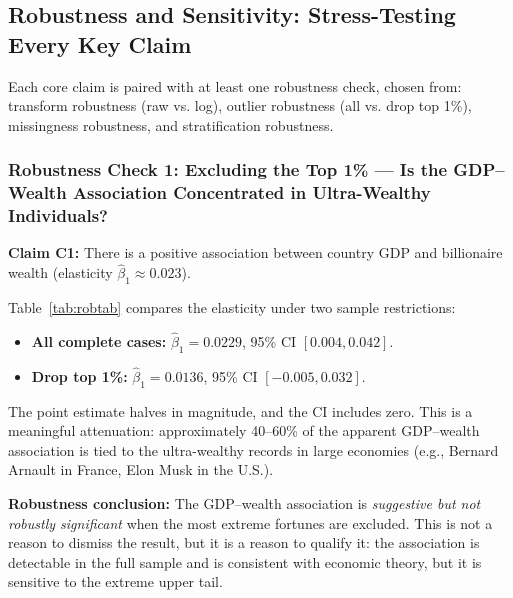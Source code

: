 \documentclass[a4paper,10pt]{article}
\begin{document}
\bigskip

\subsection{Robustness and Sensitivity: Stress-Testing Every Key Claim}\label{sec:robust}

Each core claim is paired with at least one robustness check, chosen from: transform robustness (raw vs. log), outlier robustness (all vs. drop top 1\%), missingness robustness, and stratification robustness.

\bigskip

\subsubsection{Robustness Check 1: Excluding the Top 1\% --- Is the GDP--Wealth Association Concentrated in Ultra-Wealthy Individuals?}
\textbf{Claim C1:} There is a positive association between country GDP and billionaire wealth (elasticity $\hat\beta_1 \approx 0.023$).

Table~\ref{tab:robtab} compares the elasticity under two sample restrictions:

\begin{itemize}
  \item \textbf{All complete cases:} $\hat\beta_1 = 0.0229$, 95\% CI $[0.004, 0.042]$.
  \item \textbf{Drop top 1\%:} $\hat\beta_1 = 0.0136$, 95\% CI $[-0.005, 0.032]$.
\end{itemize}

The point estimate halves in magnitude, and the CI includes zero. This is a meaningful attenuation: approximately 40--60\% of the apparent GDP--wealth association is tied to the ultra-wealthy records in large economies (e.g., Bernard Arnault in France, Elon Musk in the U.S.).

\textbf{Robustness conclusion:} The GDP--wealth association is \emph{suggestive but not robustly significant} when the most extreme fortunes are excluded. This is not a reason to dismiss the result, but it is a reason to qualify it: the association is detectable in the full sample and is consistent with economic theory, but it is sensitive to the extreme upper tail.

\begin{table}[H]
\centering
\caption{Robustness: log-GDP coefficient under alternative sample restrictions. The attenuation of the coefficient after dropping the top 1\% indicates that the association is partly concentrated in extreme fortunes from large economies.}
\label{tab:robtab}
\small

\end{table}
\end{document}
